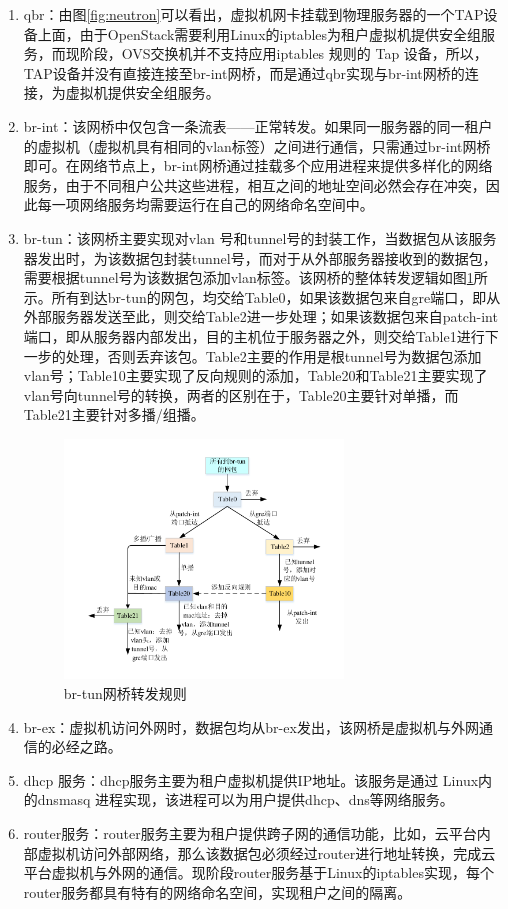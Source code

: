 \begin{enumerate}
\item qbr：由图\ref{fig:neutron}可以看出，虚拟机网卡挂载到物理服务器的一个TAP设备上面，由于OpenStack需要利用Linux的iptables为租户虚拟机提供安全组服务，而现阶段，OVS交换机并不支持应用iptables 规则的 Tap 设备，所以，TAP设备并没有直接连接至br-int网桥，而是通过qbr实现与br-int网桥的连接，为虚拟机提供安全组服务。

\item br-int：该网桥中仅包含一条流表——正常转发。如果同一服务器的同一租户的虚拟机（虚拟机具有相同的vlan标签）之间进行通信，只需通过br-int网桥即可。在网络节点上，br-int网桥通过挂载多个应用进程来提供多样化的网络服务，由于不同租户公共这些进程，相互之间的地址空间必然会存在冲突，因此每一项网络服务均需要运行在自己的网络命名空间中。
\item br-tun：该网桥主要实现对vlan 号和tunnel号的封装工作，当数据包从该服务器发出时，为该数据包封装tunnel号，而对于从外部服务器接收到的数据包，需要根据tunnel号为该数据包添加vlan标签。该网桥的整体转发逻辑如图\ref{fig:br-tun}所示。所有到达br-tun的网包，均交给Table0，如果该数据包来自gre端口，即从外部服务器发送至此，则交给Table2进一步处理；如果该数据包来自patch-int端口，即从服务器内部发出，目的主机位于服务器之外，则交给Table1进行下一步的处理，否则丢弃该包。Table2主要的作用是根tunnel号为数据包添加vlan号；Table10主要实现了反向规则的添加，Table20和Table21主要实现了vlan号向tunnel号的转换，两者的区别在于，Table20主要针对单播，而Table21主要针对多播/组播。

\begin{figure}[!htb]
  \centering
  \includegraphics[width=0.7\textwidth]{logo/br-tun}
  \caption{br-tun网桥转发规则}
  \label{fig:br-tun}
\end{figure}

\item br-ex：虚拟机访问外网时，数据包均从br-ex发出，该网桥是虚拟机与外网通信的必经之路。
\item dhcp 服务：dhcp服务主要为租户虚拟机提供IP地址。该服务是通过 Linux内的dnsmasq 进程实现，该进程可以为用户提供dhcp、dns等网络服务。 
\item router服务：router服务主要为租户提供跨子网的通信功能，比如，云平台内部虚拟机访问外部网络，那么该数据包必须经过router进行地址转换，完成云平台虚拟机与外网的通信。现阶段router服务基于Linux的iptables实现，每个router服务都具有特有的网络命名空间，实现租户之间的隔离。

\end{enumerate}

